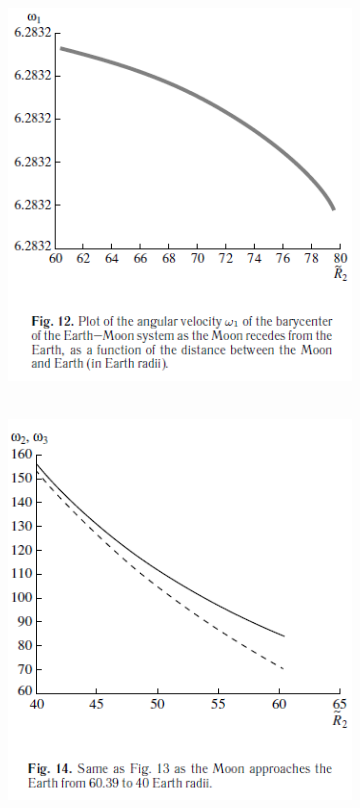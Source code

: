 \documentclass[fontsize = 11pt,a4paper]{article}
\begin{document}
\begin{figure}[h!]
\begin{subfigure}[t]{0.4\linewidth}
  \end{subfigure}
  \begin{subfigure}[b]{0.4\linewidth}
    \includegraphics[width=\linewidth]{graph12.png}
  \end{subfigure}
 \begin{subfigure}[b]{0.4\linewidth}
\hbox{\hspace{+6em}
    \includegraphics[width=\linewidth]{graph14.png}
}
  \end{subfigure}
\end{figure}
\end{document}
